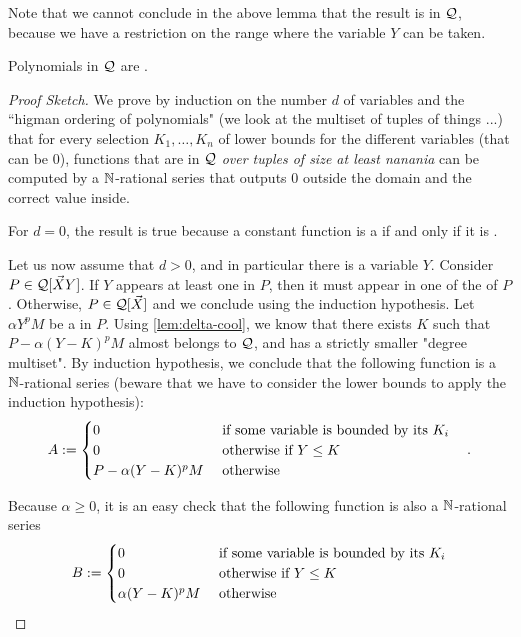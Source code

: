 \documentclass[a4paper,11pt]{article}
\begin{document}
Note that we cannot conclude in the above lemma that the result is in
$\mathcal{Q}$, because we have a restriction on the range where the variable
$Y$ can be taken.

\begin{lemma}
    \label{lem:correct-to-n-rat}
    Polynomials in $\mathcal{Q}$ are
    .
\end{lemma}
\begin{proof}[Proof Sketch]
    We prove by induction on the number $d$ of variables
    and the ``higman ordering of polynomials" (we look at the multiset
    of tuples of things ...) that for every selection
    $K_1, \dots, K_n$ of lower bounds for the different variables
    (that can be $0$),
    functions that are in $\mathcal{Q}$ \emph{over tuples of size
    at least nanania} can be computed by a $\mathbb{N}$-rational series
    that outputs $0$ outside the domain and the correct value
    inside.

    For $d = 0$,
    the result is true because
    a constant function is a 
    if and only if it is .

    Let us now assume that $d > 0$, and in particular
    there is a variable $Y$.
    Consider $P \in \mathcal{Q}[\vec{X} Y]$.
    If $Y$ appears at least one in $P$, then it must appear
    in one of the  of $P$. Otherwise,
    $P \in \mathcal{Q}[\vec{X}]$ and we conclude using the
    induction hypothesis.
    Let $\alpha Y^p M$ be a  in $P$.
    Using \cref{lem:delta-cool},
    we know that there exists $K$ such that
    $P - \alpha (Y - K)^p M$ almost belongs to $\mathcal{Q}$,
    and has a strictly smaller "degree multiset".
    By induction hypothesis,
    we conclude that
    the following function is a $\mathbb{N}$-rational series
    (beware that we have to consider the lower bounds to apply
    the induction hypothesis):
    \begin{equation*}
        A \mathrel{:=}
        \begin{cases}
            0 & \text{ if some variable is bounded by its } K_i \\
            0 & \text{ otherwise if  } Y \leq K \\
            P - \alpha(Y - K)^pM & \text{ otherwise }
        \end{cases}
        \quad .
    \end{equation*}

    Because $\alpha \geq 0$, it is an easy check
    that the following function is also a $\mathbb{N}$-rational series
    \begin{equation*}
        B \mathrel{:=}
        \begin{cases}
            0 & \text{ if some variable is bounded by its } K_i \\
            0 & \text{ otherwise if } Y \leq K \\
            \alpha(Y - K)^pM & \text{ otherwise }
        \end{cases}
    \end{equation*}


\end{proof}
\end{document}
